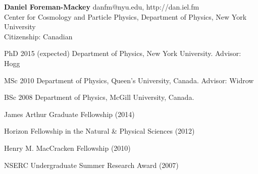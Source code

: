 \documentclass[12pt,letterpaper]{article}
\begin{document}
\thispagestyle{empty}\sloppy\sloppypar\raggedbottom

\textbf{\Large Daniel Foreman-Mackey} \hfill
\textsf{\small danfm@nyu.edu, http://dan.iel.fm} \\[0.5ex]
Center for Cosmology and Particle Physics, Department of Physics, New York
University \\
Citizenship: Canadian\\[0.5ex]

\begin{list}{}{\cvlist}
\item
PhD 2015 (expected) Department of Physics, New York University. Advisor: Hogg
\item
MSc 2010 Department of Physics, Queen's University, Canada. Advisor: Widrow
\item
BSc 2008 Department of Physics, McGill University, Canada.
\end{list}

\begin{list}{}{\cvlist}

\item James Arthur Graduate Fellowship (2014)
\item Horizon Fellowship in the Natural \& Physical Sciences (2012)
\item Henry M. MacCracken Fellowship (2010)
\item NSERC Undergraduate Summer Research Award (2007)

\end{list}

\ifdefined\withpubs
    \begin{list}{}{\cvlist}
    
    \end{list}

    \begin{list}{}{\cvlist}
    
    \end{list}
    \newpage
\fi
\end{document}
